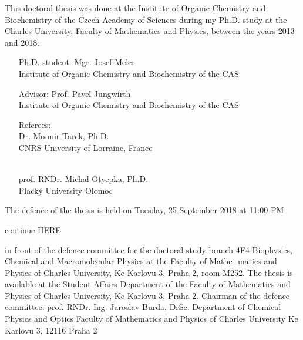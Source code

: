 \documentclass[12pt,a4paper,twoside,openright]{report}
\begin{document}
\newlength{\figwidth}
\setlength{\figwidth}{9 cm} 
\newlength{\figwidthsmall}
\setlength{\figwidthsmall}{6 cm} 
\newlength{\figwidthfull}
\setlength{\figwidthfull}{14 cm} 





This doctoral thesis was done at the Institute of Organic Chemistry and
Biochemistry of the Czech Academy of Sciences during my Ph.D. study at
the Charles University, Faculty of Mathematics and Physics, 
between the years 2013 and 2018.

\begin{itemize}
\item[Ph.D. student:] 
Mgr. Josef Melcr \\
Institute of Organic Chemistry and Biochemistry of the CAS \\

\item[Advisor:] 
Prof. Pavel Jungwirth \\
Institute of Organic Chemistry and Biochemistry of the CAS \\

\item[Referees:] ~ \\
Dr. Mounir Tarek, Ph.D. \\
CNRS-University of Lorraine, France \\
\item[~]  ~ \\ prof. RNDr. Michal Otyepka, Ph.D.  \\
Plack\'{y} University Olomoc \\
\end{itemize}

The defence of the thesis is held on Tuesday, 25 September 2018 at
11:00 PM 

continue HERE

in front of the defence committee for the doctoral study branch 4F4
Biophysics, Chemical and Macromolecular Physics at the Faculty of Mathe-
matics and Physics of Charles University, Ke Karlovu 3, Praha 2, room M252.
The thesis is available at the Student Affairs Department of the Faculty of
Mathematics and Physics of Charles University, Ke Karlovu 3, Praha 2.
Chairman of the defence committee:
prof. RNDr. Ing. Jaroslav Burda, DrSc.
Department of Chemical Physics and Optics
Faculty of Mathematics and Physics of Charles University
Ke Karlovu 3, 12116 Praha 2
\end{document}
